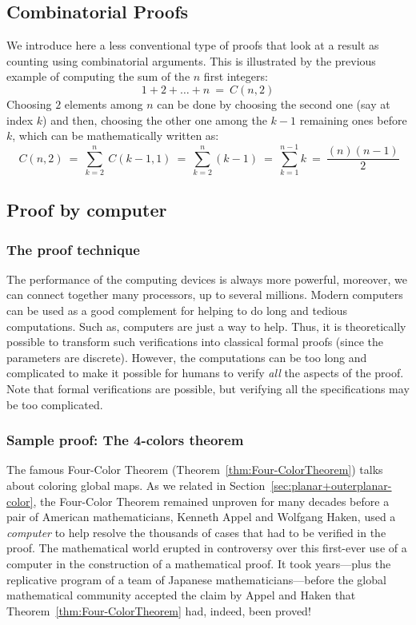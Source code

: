 \subsection{Combinatorial Proofs}

We introduce here a less conventional type of proofs that look at a result
as counting using combinatorial arguments.
This is illustrated by the previous example of computing the sum of the $n$ first integers:
\[ 1+2+ \ldots + n \ = \ C(n,2)  \]
Choosing $2$ elements among $n$ can be done by choosing the second one (say at index $k$)
and then, choosing the other one among the $k-1$ remaining ones before $k$, 
which can be mathematically written as:
\[ \ C(n,2) \ = \  \sum_{k=2}^n  \ C(k-1,1)\ = \  \sum_{k=2}^n  (k-1) \ = \  \sum_{k=1}^{n-1}  k \ = \ \frac{(n)(n-1)}{2}\]



\subsection{Proof by computer}


\subsubsection{The proof technique}

The performance of the computing devices is always more powerful,
moreover, we can connect together many processors, up to several millions.
Modern computers can be used as a good complement for helping to do long and tedious computations. 
Such as, computers are just a way to help. 
Thus, it is theoretically possible to transform such verifications into classical formal proofs (since the parameters are discrete).
However, the computations can be too long and complicated to make it possible for humans to verify \textit{all} the aspects of the proof.
Note that formal verifications are possible, but verifying all the specifications may be too complicated. 


\subsubsection{Sample proof: The 4-colors theorem}

The famous Four-Color Theorem
(Theorem~\ref{thm:Four-ColorTheorem}) talks about coloring
global maps.  As we related in
Section~\ref{sec:planar+outerplanar-color}, the Four-Color Theorem
remained unproven for many decades before a pair of American
mathematicians, Kenneth Appel  and Wolfgang
Haken,  used a {\it computer} to help resolve
the thousands of cases that had to be verified in the proof.  The
mathematical world erupted in controversy over this first-ever use of
a computer in the construction of a mathematical proof.  It took
years---plus the replicative program of a team of Japanese
mathematicians---before the global mathematical community accepted the
claim by Appel and Haken that Theorem~\ref{thm:Four-ColorTheorem} had,
indeed, been proved!


